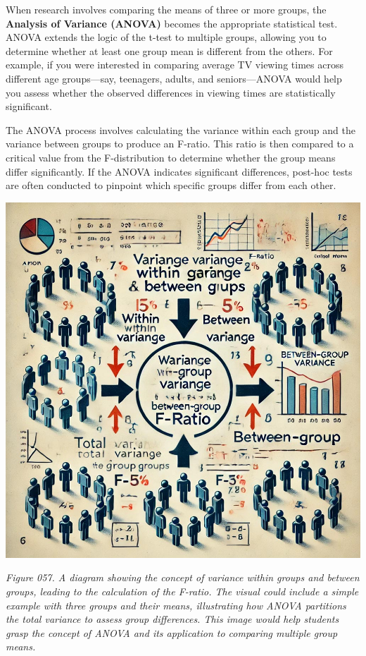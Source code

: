 \documentclass[
]{book}
\begin{document}
When research involves comparing the means of three or more groups, the \textbf{Analysis of Variance (ANOVA)} becomes the appropriate statistical test. ANOVA extends the logic of the t-test to multiple groups, allowing you to determine whether at least one group mean is different from the others. For example, if you were interested in comparing average TV viewing times across different age groups---say, teenagers, adults, and seniors---ANOVA would help you assess whether the observed differences in viewing times are statistically significant.

The ANOVA process involves calculating the variance within each group and the variance between groups to produce an F-ratio. This ratio is then compared to a critical value from the F-distribution to determine whether the group means differ significantly. If the ANOVA indicates significant differences, post-hoc tests are often conducted to pinpoint which specific groups differ from each other.

\includegraphics[width=1\textwidth,height=\textheight]{images/fig057.jpg}

\emph{Figure 057. A diagram showing the concept of variance within groups and between groups, leading to the calculation of the F-ratio. The visual could include a simple example with three groups and their means, illustrating how ANOVA partitions the total variance to assess group differences. This image would help students grasp the concept of ANOVA and its application to comparing multiple group means.}
\end{document}
